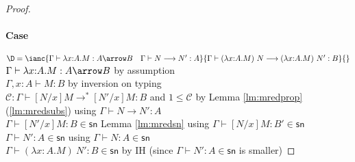 \documentclass{article}
\newcommand{\C}{\mathcal{C}}
\newcommand{\csn}{\mathsf{sn}}
\newcommand{\mred}{\longrightarrow^*}
\newcommand{\red}{\longrightarrow}
\begin{document}
\begin{proof}
\paragraph{Case}
 $\D = \ianc {\Gamma \vdash \lambda x{:}A.M : A \arrow B
        \quad \Gamma \vdash N \red N' : A}
             {\Gamma \vdash (\lambda x{:}A.M)~N \red (\lambda x{:}A.M)~N' : B}{}$
\\[0.5em]
$\Gamma \vdash \lambda x{:}A.M : A \arrow B$ \hfill by assumption \\
$\Gamma, x{:}A \vdash M : B $ \hfill by inversion on typing\\
$\C : \Gamma \vdash [N/x]M \mred [N'/x]M : B$ and $1 \leq \C$ \hfill by Lemma \ref{lm:mredprop}(\ref{lm:mredsubs}) using $\Gamma \vdash N \red N' : A$\\
$\Gamma \vdash [N'/x]M : B \in \csn$ \hfill Lemma \ref{lm:mredsn} using $\Gamma \vdash [N/x]M : B' \in \csn$\\
$\Gamma \vdash N' : A \in \csn$ \hfill using $\Gamma \vdash N : A \in \csn$\\
$\Gamma \vdash (\lambda x{:}A.M)~N' : B \in \csn$ \hfill by IH  (since $\Gamma \vdash N' : A \in \csn$ is smaller)

\end{proof}
\end{document}

